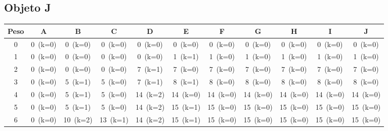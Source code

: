 \documentclass[12pt]{article}
\begin{document}
\begin{landscape}
\subsection*{Objeto J}
\begin{longtable}{ccccccccccc}
\toprule
Peso & A & B & C & D & E & F & G & H & I & J \\
\midrule
0 & \cellcolor{red!20}0~(k=0) & \cellcolor{red!20}0~(k=0) & \cellcolor{red!20}0~(k=0) & \cellcolor{red!20}0~(k=0) & \cellcolor{red!20}0~(k=0) & \cellcolor{red!20}0~(k=0) & \cellcolor{red!20}0~(k=0) & \cellcolor{red!20}0~(k=0) & \cellcolor{red!20}0~(k=0) & \cellcolor{red!20}0~(k=0) \\
1 & \cellcolor{red!20}0~(k=0) & \cellcolor{red!20}0~(k=0) & \cellcolor{red!20}0~(k=0) & \cellcolor{red!20}0~(k=0) & \cellcolor{green!40}1~(k=1) & \cellcolor{red!20}1~(k=0) & \cellcolor{red!20}1~(k=0) & \cellcolor{red!20}1~(k=0) & \cellcolor{red!20}1~(k=0) & \cellcolor{red!20}1~(k=0) \\
2 & \cellcolor{red!20}0~(k=0) & \cellcolor{red!20}0~(k=0) & \cellcolor{red!20}0~(k=0) & \cellcolor{green!40}7~(k=1) & \cellcolor{red!20}7~(k=0) & \cellcolor{red!20}7~(k=0) & \cellcolor{red!20}7~(k=0) & \cellcolor{red!20}7~(k=0) & \cellcolor{red!20}7~(k=0) & \cellcolor{red!20}7~(k=0) \\
3 & \cellcolor{red!20}0~(k=0) & \cellcolor{green!40}5~(k=1) & \cellcolor{red!20}5~(k=0) & \cellcolor{green!40}7~(k=1) & \cellcolor{green!40}8~(k=1) & \cellcolor{red!20}8~(k=0) & \cellcolor{red!20}8~(k=0) & \cellcolor{red!20}8~(k=0) & \cellcolor{red!20}8~(k=0) & \cellcolor{red!20}8~(k=0) \\
4 & \cellcolor{red!20}0~(k=0) & \cellcolor{green!40}5~(k=1) & \cellcolor{red!20}5~(k=0) & \cellcolor{green!40}14~(k=2) & \cellcolor{red!20}14~(k=0) & \cellcolor{red!20}14~(k=0) & \cellcolor{red!20}14~(k=0) & \cellcolor{red!20}14~(k=0) & \cellcolor{red!20}14~(k=0) & \cellcolor{red!20}14~(k=0) \\
5 & \cellcolor{red!20}0~(k=0) & \cellcolor{green!40}5~(k=1) & \cellcolor{red!20}5~(k=0) & \cellcolor{green!40}14~(k=2) & \cellcolor{green!40}15~(k=1) & \cellcolor{red!20}15~(k=0) & \cellcolor{red!20}15~(k=0) & \cellcolor{red!20}15~(k=0) & \cellcolor{red!20}15~(k=0) & \cellcolor{red!20}15~(k=0) \\
6 & \cellcolor{red!20}0~(k=0) & \cellcolor{green!40}10~(k=2) & \cellcolor{green!40}13~(k=1) & \cellcolor{green!40}14~(k=2) & \cellcolor{green!40}15~(k=1) & \cellcolor{red!20}15~(k=0) & \cellcolor{red!20}15~(k=0) & \cellcolor{red!20}15~(k=0) & \cellcolor{red!20}15~(k=0) & \cellcolor{red!20}15~(k=0) \\

\end{longtable}
\end{landscape}
\end{document}

